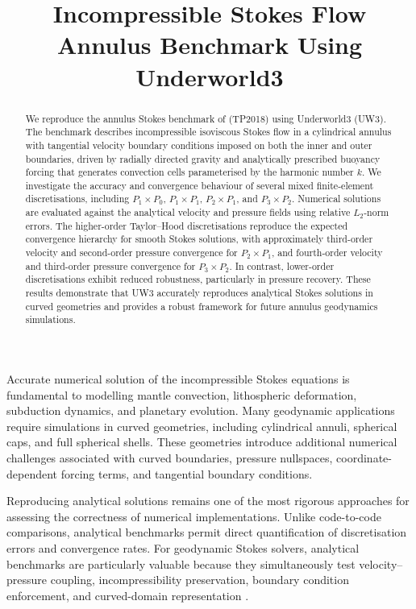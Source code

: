 \documentclass[gmd, manuscript]{copernicus}
\title{Incompressible Stokes Flow Annulus Benchmark Using Underworld3}
\affil[1]{School of Earth, Atmosphere and Environment, Monash University, Clayton, Australia}
\begin{document}
\maketitle

\begin{abstract}
We reproduce the annulus Stokes benchmark of \citet{thieulot2018} (TP2018) using
Underworld3 (UW3). The benchmark describes incompressible isoviscous Stokes flow
in a cylindrical annulus with tangential velocity boundary conditions imposed on
both the inner and outer boundaries, driven by radially directed gravity and
analytically prescribed buoyancy forcing that generates convection cells
parameterised by the harmonic number \(k\). We investigate the accuracy and
convergence behaviour of several mixed finite-element discretisations, including
\(P_1\times P_0\), \(P_1\times P_1\), \(P_2\times P_1\), and
\(P_3\times P_2\). Numerical solutions are evaluated against the analytical
velocity and pressure fields using relative \(L_2\)-norm errors. The higher-order
Taylor--Hood discretisations reproduce the expected convergence hierarchy for
smooth Stokes solutions, with approximately third-order velocity and second-order
pressure convergence for \(P_2\times P_1\), and fourth-order velocity and
third-order pressure convergence for \(P_3\times P_2\). In contrast,
lower-order discretisations exhibit reduced robustness, particularly in pressure
recovery. These results demonstrate that UW3 accurately reproduces analytical
Stokes solutions in curved geometries and provides a robust framework for future
annulus geodynamics simulations.
\end{abstract}

\introduction

Accurate numerical solution of the incompressible Stokes equations is fundamental
to modelling mantle convection, lithospheric deformation, subduction dynamics,
and planetary evolution. Many geodynamic applications require simulations in
curved geometries, including cylindrical annuli, spherical caps, and full
spherical shells. These geometries introduce additional numerical challenges
associated with curved boundaries, pressure nullspaces, coordinate-dependent
forcing terms, and tangential boundary conditions.

Reproducing analytical solutions remains one of the most rigorous approaches for
assessing the correctness of numerical implementations. Unlike code-to-code
comparisons, analytical benchmarks permit direct quantification of discretisation
errors and convergence rates. For geodynamic Stokes solvers, analytical
benchmarks are particularly valuable because they simultaneously test
velocity--pressure coupling, incompressibility preservation, boundary condition
enforcement, and curved-domain representation \citep{kramer2021,davies2022}.
\end{document}
